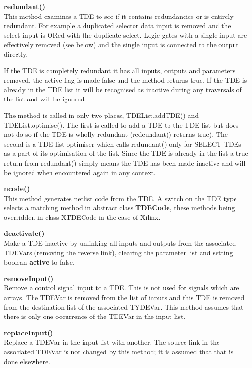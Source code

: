     {\bf redundant()} \\ This method examines a TDE to see if it contains
    redundancies or is entirely redundant. For example a duplicated selector
    data input is removed and the select input is ORed with the duplicate
    select. Logic gates with a single input are effectively removed (see below)
    and the single input is connected to the output directly.

    If the TDE is completely redundant it has all inputs, outputs and parameters
    removed, the active flag is made false and the method returns true. If the
    TDE is already in the TDE list it will be recognised as inactive during any
    traversals of the list and will be ignored.

    The method is called in only two places, TDEList.addTDE() and
    TDEList.optimise(). The first is called to add a TDE to the TDE list but
    does not do so if the TDE is wholly redundant (redeundant() returns true).
    The second is a TDE list optimiser which calls redundant() only for SELECT
    TDEs as a part of its optimisation of the list. Since the TDE is already in
    the list a true return from redundant() simply means the TDE has been made
    inactive and will be ignored when encountered again in any context.


    {\bf ncode()} \\ This method generates netlist code from the TDE. A switch
    on the TDE type selects a matching method in abstract class {\bf TDECode},
    these methods being overridden in class XTDECode in the case of Xilinx.

    {\bf deactivate()} \\ Make a TDE inactive by unlinking all inputs and
    outputs from the associated TDEVars (removing the reverse link), clearing
    the parameter list and setting boolean {\bf active} to false.

    {\bf removeInput()} \\ Remove a control signal input to a TDE. This is not
    used for signals which are arrays. The TDEVar is removed from the list of
    inputs and this TDE is removed from the destination list of the associated
    TYDEVar. This method assumes that there is only one occurrence of the TDEVar
    in the input list.

    {\bf replaceInput()} \\ Replace a TDEVar in the input list with another. The
    source link in the associated TDEVar is not changed by this method; it is
    assumed that that is done elsewhere.


